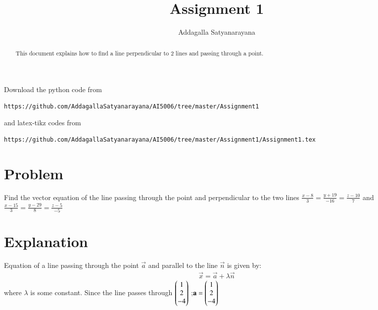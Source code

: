\documentclass[journal,12pt,twocolumn]{IEEEtran}
\begin{document}
\renewcommand{\thefigure}{\theproblem}
\def\putbox#1#2#3{\makebox[0in][l]{\makebox[#1][l]{}\raisebox{\baselineskip}[0in][0in]{\raisebox{#2}[0in][0in]{#3}}}}
     \def\rightbox#1{\makebox[0in][r]{#1}}
     \def\centbox#1{\makebox[0in]{#1}}
     \def\topbox#1{\raisebox{-\baselineskip}[0in][0in]{#1}}
     \def\midbox#1{\raisebox{-0.5\baselineskip}[0in][0in]{#1}}
\vspace{3cm}
\title{Assignment 1}
\author{Addagalla Satyanarayana}
\maketitle
\newpage
\bigskip
\renewcommand{\thefigure}{\theenumi}
\renewcommand{\thetable}{\theenumi}
\begin{abstract}
This document explains how to find a line perpendicular to 2 lines and passing through a point.
\end{abstract}
Download the python code from 
%
\begin{lstlisting}
https://github.com/AddagallaSatyanarayana/AI5006/tree/master/Assignment1
\end{lstlisting}
%
and latex-tikz codes from 
%
\begin{lstlisting}
https://github.com/AddagallaSatyanarayana/AI5006/tree/master/Assignment1/Assignment1.tex
\end{lstlisting}
%

\section{Problem}
Find the vector equation of the line passing through the point
 and perpendicular to the two lines
$\frac{x-8}{3} = \frac{y+19}{-16}= \frac{z-10}{7}$  and
$\frac{x-15}{3} = \frac{y-29}{8}= \frac{z-5}{-5}$
	
	
\section{Explanation}
Equation of a line passing through the point $\vec{a}$ and parallel to the line $\vec{n}$ is given by:
\begin{align}
 \vec{x} =\vec{a} + \lambda\vec{n}\label{eq:1}
\end{align}
where $\lambda$ is some constant.
Since the line passes through
$\begin{pmatrix}1 \\2 \\-4\end{pmatrix}$ ;$\mathbf{a} = \begin{pmatrix}1 \\2 \\-4\end{pmatrix}$
\end{document}
